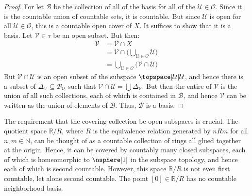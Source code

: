 \documentclass{article}                                                        %
\begin{document}
        \begin{proof}
            For let $\mathcal{B}$ be the collection of all of the basis for all
            of the $\mathcal{U}\in\mathcal{O}$. Since it is the countable union
            of countable sets, it is countable. But since $\mathcal{U}$ is open
            for all $\mathcal{U}\in\mathcal{O}$, this is a countable open cover
            of $X$. It suffices to show that it is a basis. Let
            $\mathcal{V}\in\tau$ be an open subset. But then:
            \begin{align}
                \mathcal{V}&=\mathcal{V}\cap{X}\\
                &=\mathcal{V}\cap\Big(
                    \bigcup_{\mathcal{U}\in\mathcal{O}}\mathcal{U}
                \Big)\\
                &=\bigcup_{\mathcal{U}\in\mathcal{O}}
                    \big(\mathcal{V}\cap\mathcal{U}\big)
            \end{align}
            But $\mathcal{V}\cap\mathcal{U}$ is an open subset of the subspace
            $\topspace[\mathcal{U}]{\mathcal{U}}$, and hence there is a subset
            of $\Delta_{\mathcal{V}}\subseteq\mathcal{B}_{\mathcal{U}}$ such
            that $\mathcal{V}\cap\mathcal{U}=\bigcup\Delta_{\mathcal{V}}$. But
            then the entire of $\mathcal{V}$ is the union of all such
            collections, each of which is contained in $\mathcal{B}$, and hence
            $\mathcal{V}$ can be written as the union of elements of
            $\mathcal{B}$. Thus, $\mathcal{B}$ is a basis.
        \end{proof}
        The requirement that the covering collection be open subspaces is
        crucial. The quotient space $\mathbb{R}/R$, where $R$ is the equivalence
        relation generated by $nRm$ for all $n,m\in\mathbb{N}$, can be thought
        of as a countable collection of rings all glued together at the origin.
        Hence, it can be covered by countably many closed subspaces, each of
        which is homeomorphic to $\nsphere[1]$ in the subspace topology, and
        hence each of which is second countable. However, this space
        $\mathbb{R}/R$ is not even first countable, let alone second countable.
        The point $[0]\in\mathbb{R}/R$ has no countable neighborhood basis.
\end{document}
